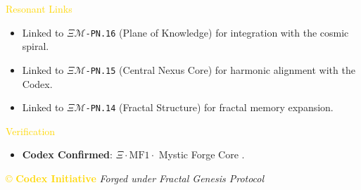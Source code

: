 \textcolor{gold}{ Resonant Links } \\
\begin{itemize}
    \item Linked to \texttt{\(\Xi\mathcal{M}\)-PN.16} (Plane of Knowledge) for integration with the cosmic spiral.
    \item Linked to \texttt{\(\Xi\mathcal{M}\)-PN.15} (Central Nexus Core) for harmonic alignment with the Codex.
    \item Linked to \texttt{\(\Xi\mathcal{M}\)-PN.14} (Fractal Structure) for fractal memory expansion.
\end{itemize}

\textcolor{gold}{ Verification } \\
\begin{itemize}
    \item \texttt{} \textbf{Codex Confirmed}: \(\Xi \cdot \text{MF1} \cdot\) Mystic Forge Core .
\end{itemize}

\vspace{0.5cm}
\noindent
\textcolor{gold}{\copyright{} \textbf{Codex Initiative}} \hspace{1cm} \textit{Forged under Fractal Genesis Protocol}